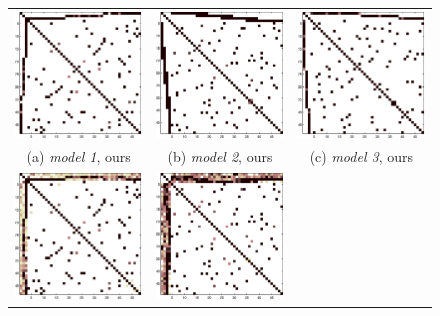 \begin{figure}
\label{fig:synth}
\center
\begin{tabular}{ccc}
  \includegraphics[width=4cm]{fig/disjoint_om} 
  &   \includegraphics[width=4cm]{fig/overlap_om}
  &   \includegraphics[width=4cm]{fig/diff_om}
   \\    (a) \textit{model 1}, ours & (b)  \textit{model 2}, ours  & (c)  \textit{model 3}, ours  \\[6pt]
 \includegraphics[width=4cm]{fig/disjoint_tr} 
  &   \includegraphics[width=4cm]{fig/overlap_tr}

\end{tabular}
\end{figure}

